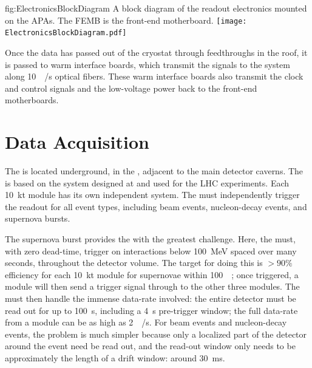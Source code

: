 \begin{dunefigure}{fig:ElectronicsBlockDiagram}
{A block diagram of the readout electronics mounted on the APAs. The FEMB is the front-end motherboard.}
\texttt{[image: ElectronicsBlockDiagram.pdf]}
\end{dunefigure}

Once the data has passed out of the cryostat through feedthroughs in the roof, it is passed to warm interface boards, which transmit the signals to the  system along \SI{10}{\giga\byte/\second} optical fibers. These warm interface boards also transmit the clock and control signals and the low-voltage power back to the front-end motherboards.

\section{Data Acquisition}
\label{sec:fdsp-exec-daq}

The  is located underground, in the , adjacent to the main detector caverns. The  is based on the  system designed at  and used for the LHC  experiments. Each \SI{10}{\kilo\tonne} module has its own independent  system. The  must independently trigger the  readout for all event types, including beam events, nucleon-decay events, and supernova bursts.

The supernova burst provides the  with the greatest challenge. Here, the  must, with zero dead-time, trigger on interactions below \SI{100}{\mega\electronvolt} spaced over many seconds, throughout the detector volume. The target for doing this is $>\!90\%$ efficiency for each \SI{10}{\kilo\tonne} module for supernovae within \SI{100}{\kilo\parsec}; once triggered, a module will then send a trigger signal through to the other three modules. The  must then handle the immense data-rate involved: the entire detector must be read out for up to \SI{100}{\second}, including a \SI{4}{\second} pre-trigger window; the full data-rate from a module can be as high as \SI{2}{\tera\byte/\second}. For beam events and nucleon-decay events, the problem is much simpler because only a localized part of the detector around the event need be read out, and the read-out window only needs to be approximately the length of a drift window: around \SI{30}{\milli\second}.

